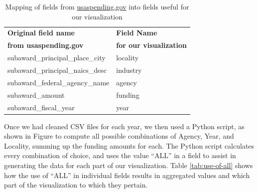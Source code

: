 \documentclass[10pt,journal,compsoc]{IEEEtran}
\begin{document}
\begin{table}[t]
\centering
\begin{tabular}{l | l}
\hline
\textbf{Original field name} & \textbf{Field Name} \\
\textbf{from usaspending.gov} & \textbf{for our visualization} \\ \hline
subaward\_principal\_place\_city         & locality                         \\
subaward\_principal\_naics\_desc         & industry                         \\
subaward\_federal\_agency\_name          & agency                           \\
subaward\_amount                         & funding                          \\
subaward\_fiscal\_year                   & year                                 \\ \hline
\end{tabular}
\caption{Mapping of fields from \protect\url{usaspending.gov} into fields useful for our visualization}
\label{tab:data-mapping}
\end{table}

Once we had cleaned CSV files for each year, we then used a Python script, as shown in Figure  to compute all possible combinations of Agency, Year, and Locality, summing up the funding amounts for each.  The Python script calculates every combination of choice, and uses the value ``ALL'' in a field to assist in generating the data for each part of our visualization.  Table \ref{tab:use-of-all} shows how the use of ``ALL'' in individual fields results in aggregated values and which part of the visualization to which they pertain.
\end{document}
